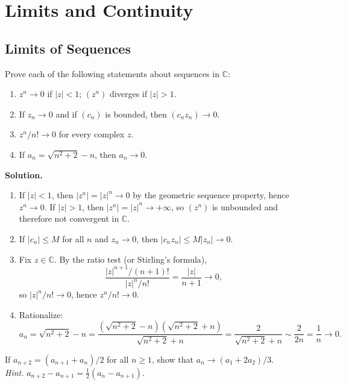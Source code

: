 \chapter{Limits and Continuity}

\section{Limits of Sequences}

\begin{problembox}
Prove each of the following statements about sequences in $\mathbb{C}$:
\begin{enumerate}[label=(\alph*)]
\item $z^n \to 0$ if $|z| < 1$; $(z^n)$ diverges if $|z| > 1$.
\item If $z_n \to 0$ and if $(c_n)$ is bounded, then $(c_n z_n) \to 0$.
\item $z^n / n! \to 0$ for every complex $z$.
\item If $a_n = \sqrt{n^2 + 2} - n$, then $a_n \to 0$.
\end{enumerate}
\end{problembox}

\noindent\textbf{Solution.}
\begin{enumerate}[label=(\alph*)]
\item If $|z|<1$, then $|z^n|=|z|^n\to 0$ by the geometric sequence property, hence $z^n\to 0$. If $|z|>1$, then $|z^n|=|z|^n\to +\infty$, so $(z^n)$ is unbounded and therefore not convergent in $\mathbb{C}$.
\item If $|c_n|\le M$ for all $n$ and $z_n\to 0$, then $|c_n z_n|\le M|z_n|\to 0$.
\item Fix $z\in\mathbb{C}$. By the ratio test (or Stirling's formula),
\[
\frac{|z|^{n+1}/(n+1)!}{|z|^n/n!}=\frac{|z|}{n+1}\to 0,
\]
so $|z|^n/n!\to 0$, hence $z^n/n!\to 0$.
\item Rationalize:
\[
a_n=\sqrt{n^2+2}-n=\frac{(\sqrt{n^2+2}-n)(\sqrt{n^2+2}+n)}{\sqrt{n^2+2}+n}
=\frac{2}{\sqrt{n^2+2}+n}\sim \frac{2}{2n}=\frac{1}{n}\to 0.
\]
\end{enumerate}
\medskip

\begin{problembox}
If $a_{n+2} = (a_{n+1} + a_n)/2$ for all $n \geq 1$, show that $a_n \to (a_1 + 2a_2)/3$. \\
\textit{Hint.} $a_{n+2} - a_{n+1} = \frac{1}{2}(a_n - a_{n+1})$.
\end{problembox}

